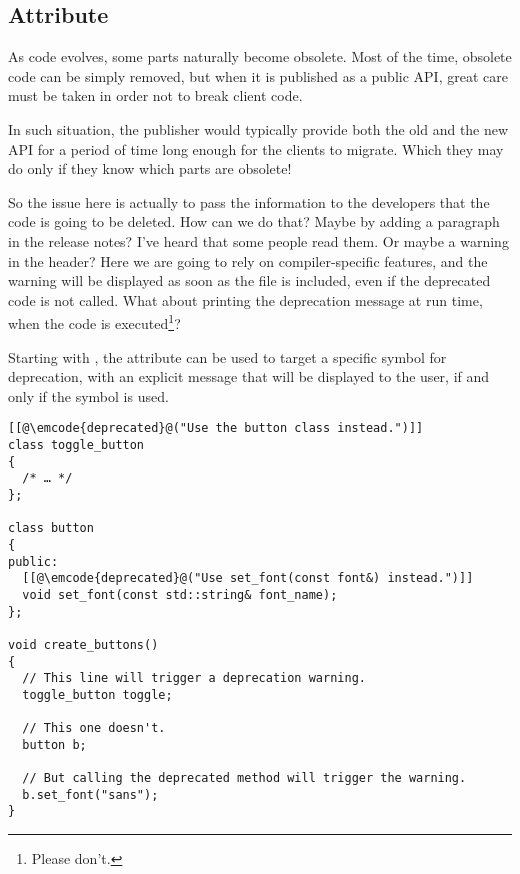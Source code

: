 \subsection{\code{[[deprecated]]} Attribute}

As code evolves, some parts naturally become obsolete. Most of the time,
obsolete code can be simply removed, but when it is published as a
public API, great care must be taken in order not to break client
code.

In such situation, the publisher would typically provide both the old
and the new API for a period of time long enough for the clients to
migrate. Which they may do only if they know which parts are obsolete!

So the issue here is actually to pass the information to the
developers that the code is going to be deleted. How can we do that?
Maybe by adding a paragraph in the release notes? I've heard that some
people read them. Or maybe a warning in the header? Here we are going
to rely on compiler-specific features, and the warning will be
displayed as soon as the file is included, even if the deprecated code
is not called. What about printing the deprecation message at run
time, when the code is executed\footnote{Please don't.}?

\bigskip

Starting with , the \code{[[deprecated]]} attribute can be used
to target a specific symbol for deprecation, with an explicit message
that will be displayed to the user, if and only if the symbol is used.

\begin{lstlisting}
[[@\emcode{deprecated}@("Use the button class instead.")]]
class toggle_button
{
  /* … */
};

class button
{
public:
  [[@\emcode{deprecated}@("Use set_font(const font&) instead.")]]
  void set_font(const std::string& font_name);
};

void create_buttons()
{
  // This line will trigger a deprecation warning.
  toggle_button toggle;

  // This one doesn't.
  button b;

  // But calling the deprecated method will trigger the warning.
  b.set_font("sans");
}
\end{lstlisting}

